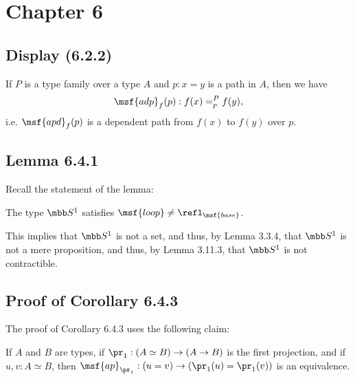 \documentclass[12pt]{article}
\begin{document}





\section{Chapter 6}

\subsection{Display (6.2.2)}

If $P$ is a type family over a type $A$ and $p:x=y$ is a path in $A$, then we have 
$$
\msf{adp}_f(p):f(x)=^P_pf(y),
$$ 
i.e. $\msf{apd}_f(p)$ is a dependent path from $f(x)$ to $f(y)$ over $p$.


\subsection{Lemma 6.4.1}

Recall the statement of the lemma:

The type $\mbb S^1$ satisfies $\msf{loop}\neq\refl_{\msf{base}}$. 

This implies that $\mbb S^1$ is not a set, and thus, by Lemma 3.3.4, that $\mbb S^1$ is not a mere proposition, and thus, by Lemma 3.11.3, that $\mbb S^1$ is not contractible.


\subsection{Proof of Corollary 6.4.3} %


The proof of Corollary 6.4.3 uses the following claim:

\nn If $A$ and $B$ are types, if $\pr_1:(A\simeq B)\to(A\to B)$ is the first projection, and if $u,v:A\simeq B$, then $\msf{ap}_{\pr_1}:(u=v)\to(\pr_1(u)=\pr_1(v))$ is an equivalence.
\end{document}
